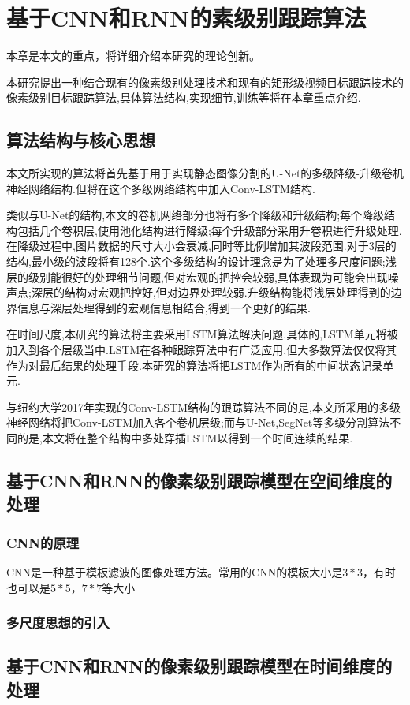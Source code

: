 \chapter{基于CNN和RNN的素级别跟踪算法}
本章是本文的重点，将详细介绍本研究的理论创新。
\par
本研究提出一种结合现有的像素级别处理技术和现有的矩形级视频目标跟踪技术的像素级别目标跟踪算法,具体算法结构,实现细节,训练等将在本章重点介绍.
\section{算法结构与核心思想}
本文所实现的算法将首先基于用于实现静态图像分割的U-Net\supercite{ronneberger2015u}的多级降级-升级卷机神经网络结构.但将在这个多级网络结构中加入Conv-LSTM结构.
\par
类似与U-Net的结构,本文的卷机网络部分也将有多个降级和升级结构;每个降级结构包括几个卷积层,使用池化结构进行降级;每个升级部分采用升卷积进行升级处理.在降级过程中,图片数据的尺寸大小会衰减,同时等比例增加其波段范围.对于3层的结构,最小级的波段将有128个.这个多级结构的设计理念是为了处理多尺度问题;浅层的级别能很好的处理细节问题,但对宏观的把控会较弱,具体表现为可能会出现噪声点;深层的结构对宏观把控好,但对边界处理较弱.升级结构能将浅层处理得到的边界信息与深层处理得到的宏观信息相结合,得到一个更好的结果.
\par
在时间尺度,本研究的算法将主要采用LSTM算法解决问题.具体的,LSTM单元将被加入到各个层级当中.LSTM在各种跟踪算法中有广泛应用,但大多数算法仅仅将其作为对最后结果的处理手段.本研究的算法将把LSTM作为所有的中间状态记录单元.
\par
与纽约大学2017年实现的Conv-LSTM结构的跟踪算法不同的是,本文所采用的多级神经网络将把Conv-LSTM加入各个卷机层级;而与U-Net,SegNet等多级分割算法不同的是,本文将在整个结构中多处穿插LSTM以得到一个时间连续的结果.
\section{基于CNN和RNN的像素级别跟踪模型在空间维度的处理}
\subsection{CNN的原理}
CNN是一种基于模板滤波的图像处理方法。常用的CNN的模板大小是$3*3$，有时也可以是$5*5$，$7*7$等大小
\subsection{多尺度思想的引入}
\section{基于CNN和RNN的像素级别跟踪模型在时间维度的处理}
